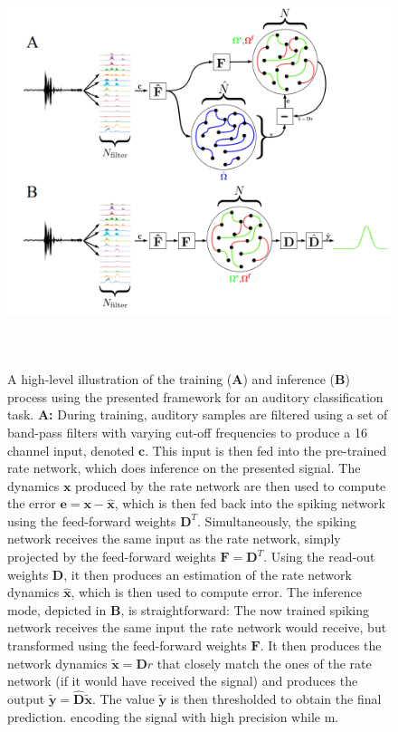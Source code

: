 \documentclass[twoside,11pt,titlepage]{article}
\begin{document}
\newpage

\begin{figure}[!htb]
  \includegraphics[width = \columnwidth, height=12cm]{figures/setup_complete.png}
  \caption{A high-level illustration of the training (\textbf{A}) and inference (\textbf{B}) process using the presented framework for an auditory classification task.
  \textbf{A:} During training, auditory samples are filtered using a set of band-pass filters with varying cut-off frequencies to produce a
  16 channel input, denoted $\mathbf{c}$. This input is then fed into the pre-trained rate network, which does inference on the presented signal. The dynamics
  $\mathbf{x}$ produced by the rate network are then used to compute the error $\mathbf{e} = \mathbf{x} - \hat{\mathbf{x}}$, which is then fed back into
  the spiking network using the feed-forward weights $\mathbf{D}^T$. Simultaneously, the spiking network receives the same input as the rate network, simply projected by the feed-forward
  weights $\mathbf{F} = \mathbf{D}^T$. Using the read-out weights $\mathbf{D}$, it then produces an estimation of the rate network dynamics $\hat{\mathbf{x}}$, which is then used to compute
  error. \newline
  The inference mode, depicted in \textbf{B}, is straightforward: The now trained spiking network receives the same input the rate network would receive, but transformed using the
  feed-forward weights $\mathbf{F}$. It then produces the network dynamics $\tilde{\mathbf{x}} = \mathbf{D}r$ that closely match the ones of the rate network (if it would have received the signal)
  and produces the output $\tilde{\mathbf{y}} = \hat{\mathbf{D}}\tilde{\mathbf{x}}$. The value $\tilde{\mathbf{y}}$ is then thresholded to obtain the final prediction. 
  encoding the signal with high precision while m.}
  \label{fig:figure1}
\end{figure}
\end{document}
